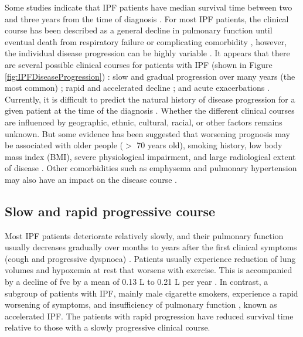 Some studies indicate that IPF patients have median survival time between two and three years from the time of diagnosis \citep{bjoraker1998prognostic, flaherty2002clinical, nicholson2000prognostic, rudd2007british, king2001idiopathic, king2011idiopathic}. For most IPF patients, the clinical course has been described as a general decline in pulmonary function until eventual death from respiratory failure or complicating comorbidity \citep{carrington1978natural, tukiainen1983prognosis, gross2001idiopathic}, however, the individual disease progression can be highly variable \citep{kim2006classification,meltzer2008idiopathic}. It appears that there are several possible clinical courses for patients with IPF (shown in Figure \ref{fig:IPFDiseaseProgression}) \citep{raghu1987idiopathic}: slow and gradual progression over many years (the most common) \citep{ryu2014idiopathic,meltzer2008idiopathic,raghu2011official}; rapid and accelerated decline \citep{kim2006classification,selman2007accelerated}; and acute exacerbations \citep{king2011idiopathic,xaubet2017idiopathic}. Currently, it is difficult to predict the natural history of disease progression for a given patient at the time of the diagnosis \citep{raghu2011official}. Whether the different clinical courses are influenced by geographic, ethnic, cultural, racial, or other factors remains unknown. But some evidence has been suggested that worsening prognosis may be associated with older people ($>$ 70 years old), smoking history, low body mass index (BMI), severe physiological impairment, and large radiological extent of disease \citep{ley2011clinical}. Other comorbidities such as emphysema and pulmonary hypertension may also have an impact on the disease course \citep{mejia2009idiopathic, wells2003idiopathic, lettieri2006prevalence}.
\newpage

\subsection{Slow and rapid progressive course}
Most IPF patients deteriorate relatively slowly, and their pulmonary function usually decreases gradually over months to years after the first clinical symptoms (cough and progressive dyspnoea) \citep{ryu2014idiopathic,meltzer2008idiopathic,raghu2011official}. Patients usually experience reduction of lung volumes and hypoxemia at rest that worsens with exercise. This is accompanied by a decline of \gls{fvc}  by a mean of 0.13 L to 0.21 L per year \citep{ley2011clinical}. In contrast, a subgroup of patients with IPF, mainly male cigarette smokers, experience a rapid worsening of symptoms, and insufficiency of pulmonary function \citep{kim2006classification, king2011idiopathic}, known as accelerated IPF. The patients with rapid progression have reduced survival time relative to those with a slowly progressive clinical course.

